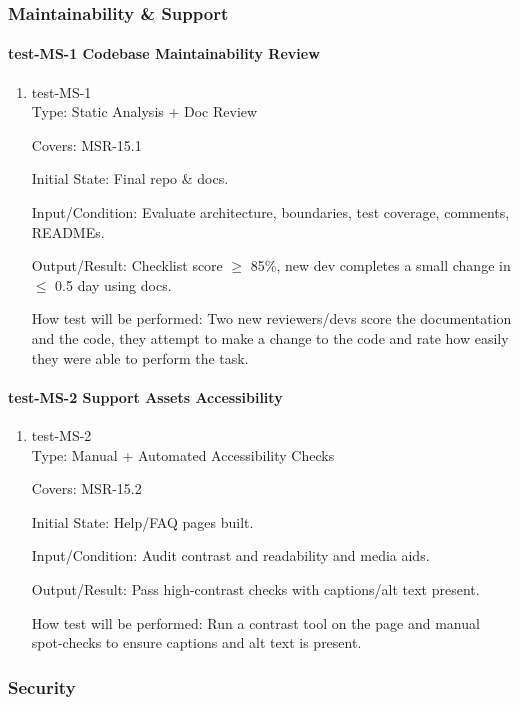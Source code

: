 \documentclass[12pt, titlepage]{article}
\begin{document}
\subsubsection{Maintainability \& Support}

\paragraph{test-MS-1 Codebase Maintainability Review}

\begin{enumerate}
\item{test-MS-1\\}
Type: Static Analysis + Doc Review

Covers: MSR-15.1

Initial State: Final repo \& docs.

Input/Condition: Evaluate architecture, boundaries, test coverage, comments, READMEs.

Output/Result: Checklist score $\geq$ 85\%, new dev completes a small change in $\leq$ 0.5 day using docs.

How test will be performed: Two new reviewers/devs score the documentation and the code, they attempt to make a change to the code and rate how easily they were able to perform the task.
\end{enumerate}

\paragraph{test-MS-2 Support Assets Accessibility}

\begin{enumerate}
\item{test-MS-2\\}
Type: Manual + Automated Accessibility Checks

Covers: MSR-15.2

Initial State: Help/FAQ pages built.

Input/Condition: Audit contrast and readability and media aids.

Output/Result: Pass high-contrast checks with captions/alt text present.

How test will be performed: Run a contrast tool on the page and manual spot-checks to ensure captions and alt text is present.
\end{enumerate}

\subsubsection{Security}
\end{document}
